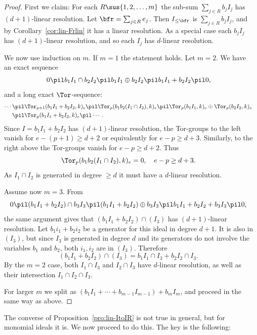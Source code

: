 \begin{proof}
  First we claim: For each   $R \sus \{1,2, \ldots, m\}$
  the sub-sum  $\sum_{j \in R} b_j I_j$ has $(d+1)$-linear resolution.
  Let $\bfr = \sum_{j \in R} e_j $. Then $I_{\leq \bfr}$ is 
 $\sum_{j \in R} b_j I_j$, and by Corollary~\ref{cor:lin-Frlin}
it has a linear resolution. 
As a special case each  $b_j I_j$ has $(d+1)$-linear
resolution, and so each $I_j$ has $d$-linear resolution.


We now use induction on $m$. If $m = 1$ the statement holds.
Let $m = 2$. We have
an exact sequence
\[ 0 \pil b_1 I_1 \cap b_2I_2 \pil b_1I_1 \oplus b_2I_2 \pil
b_1 I_1 + b_2 I_2 \pil 0, \]
and a long exact $\Tor$-sequence:
{\small \begin{align*}  \cdots \pil & \Tor_{p+1}(b_1I_1 + b_2 I_2, k)_e \pil
  \Tor_{p}(b_1b_2 (I_1 \cap I_2), k)_e \pil \Tor_p(b_1I_1,k)_e \oplus
                           \Tor_p(b_2I_2,k)_e \\
  \pil & \Tor_{p}(b_1I_1 + b_2 I_2, k)_e \pil \cdots .
\end{align*}}Since $I = b_1I_1 + b_2 I_2$ has $(d+1)$-linear resolution, the Tor-groups
to the left vanish for $e - (p+1) \geq d+2$ or equivalently for $e-p \geq d+3$.
Similarly, to the right above the Tor-groups vanish for $e-p \geq d+2$.
Thus
\[ \Tor_{p}(b_1b_2 (I_1 \cap I_2), k)_e = 0, \quad e-p \geq d+3.\]
As $I_1 \cap I_2$ is generated in degree $\geq d$ it must have a
$d$-linear resolution.

Assume now $m = 3$. From
\[ 0 \pil (b_1 I_1 +  b_2I_2) \cap b_3I_3 \pil (b_1I_1 + b_2I_2)
  \oplus b_3 I_3 \pil
b_1 I_1 + b_2 I_2 + b_3I_3 \pil 0, \]
the same argument gives that $(b_1I_1 + b_2 I_2) \cap (I_3)$ has
$(d+1)$-linear resolution. Let $b_1 i_1 + b_2 i_2$ be a generator for
this ideal in degree $d+1$. It is also in $(I_3)$, but since $I_3$ is generated
in degree $d$ and its generators do not involve the variables $b_1$ and $b_2$,
both $i_1, i_2 $ are in $(I_3)$. 
Therefore
\[ (b_1 I_1 + b_2I_2) \cap (I_3) = b_1 I_1 \cap I_3 + b_2 I_2 \cap I_3. \]
By the $m = 2$ case, both $I_1 \cap I_3$ and $I_2 \cap I_3$ have
$d$-linear resolution, as well as their intersection $I_1 \cap I_2 \cap I_3$.

For larger $m$ we split as $(b_1I_1 + \cdots + b_{m-1}I_{m-1}) + b_mI_m$, and
proceed in the same way as above.
\end{proof}

The converse of Proposition~\ref{pro:lin-ItoIR} is not true
in general, but for monomial ideals it is.
We now proceed to do this. The key is the following:

